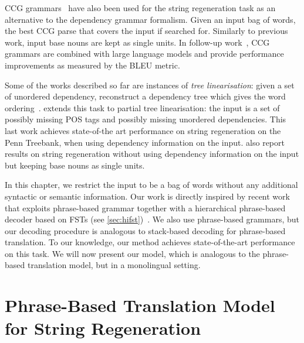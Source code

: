 CCG grammars~\citep{zhang-clark:2011:EMNLP} have also been used
for the string regeneration task as an alternative
to the dependency grammar formalism. Given an input bag
of words, the best CCG parse that covers the input if searched
for. Similarly to previous work, input base nouns are kept as
single units. In follow-up work~\citep{zhang-blackwood-clark:2012:EACL2012},
CCG grammars are combined with large language models
and provide performance improvements as measured by the BLEU
metric.

Some of the works described so far are instances of \emph{tree linearisation}: given
a set of unordered dependency, reconstruct a dependency tree which gives
the word ordering~\citep{belz-bohnet-mille-wanner-white:2012:INLG}.
\citet{zhang:2013:IJCAI} extends this task to partial tree linearisation: the
input is a set of possibly missing POS tags and possibly missing unordered
dependencies. This last work achieves state-of-the art performance on string regeneration
on the Penn Treebank, when using dependency information on the input.
\citet{zhang:2013:IJCAI} also report results on string regeneration without
using dependency information on the input but keeping base nouns as single
units.

In this chapter, we restrict the input to be a bag of words without any additional
syntactic or semantic information.
Our work is directly inspired by recent work that exploits phrase-based
grammar together with a hierarchical phrase-based decoder based on
FSTs (see \autoref{sec:hifst})~\citep{degispert-tomalin-byrne:2014:EACL}. We
also use phrase-based grammars, but
our decoding procedure is analogous to stack-based decoding for phrase-based
translation.
To our knowledge, our method achieves state-of-the-art performance
on this task. We will now present our model, which is analogous
to the phrase-based translation model, but in a monolingual setting.



\section{Phrase-Based Translation Model for String Regeneration}
\label{sec:gyroPhraseBasedModel}

